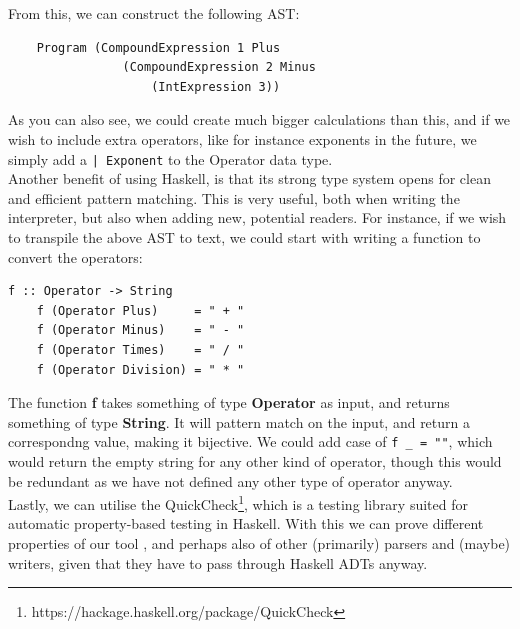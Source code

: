 From this, we can construct the following AST:

\begin{verbatim}
    Program (CompoundExpression 1 Plus
                (CompoundExpression 2 Minus
                    (IntExpression 3))
\end{verbatim}

As you can also see, we could create much bigger calculations than this, and if we wish to include extra operators, like for instance exponents in the future, we simply add a \texttt{| Exponent} to the Operator data type. \hfill \\

Another benefit of using Haskell, is that its strong type system opens for clean and efficient pattern matching. This is very useful, both when writing the interpreter, but also when adding new, potential readers. For instance, if we wish to transpile the above AST to text, we could start with writing a function to convert the operators:

\begin{lstlisting}[caption={Haskell example to convert data type to string}, captionpos=b]
    f :: Operator -> String
    f (Operator Plus)     = " + "
    f (Operator Minus)    = " - "
    f (Operator Times)    = " / "
    f (Operator Division) = " * "
\end{lstlisting}

The function \textbf{f} takes something of type \textbf{Operator} as input, and returns something of type \textbf{String}. It will pattern match on the input, and return a correspondng value, making it bijective. We could add case of \texttt{f \_ = ""}, which would return the empty string for any other kind of operator, though this would be redundant as we have not defined any other type of operator anyway. \hfill \\

Lastly, we can utilise the QuickCheck\footnote{https://hackage.haskell.org/package/QuickCheck}, which is a testing library suited for automatic property-based testing in Haskell. With this we can prove different properties of our tool \cite{DBLP:conf/icfp/ClaessenH00}, and perhaps also of other (primarily) parsers and (maybe) writers, given that they have to pass through Haskell ADTs anyway.